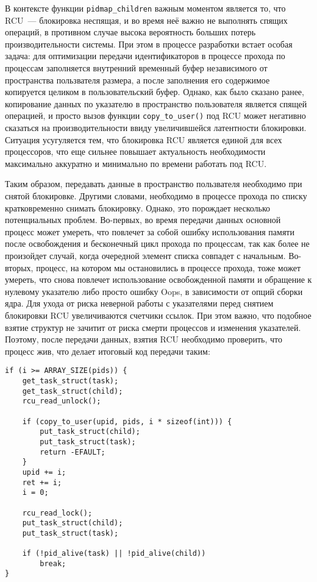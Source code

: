 В контексте функции \texttt{pidmap\_children} важным моментом является то, что
RCU~--- блокировка неспящая, и во время неё важно не выполнять спящих операций,
в противном случае высока вероятность больших потерь производительности системы.
При этом в процессе разработки встает особая задача: для оптимизации передачи
идентификаторов в процессе прохода по процессам заполняется внутренний временный
буфер независимого от пространства пользвателя размера, а после заполнения его
содержимое копируется целиком в пользовательский буфер. Однако, как было сказано
ранее, копирование данных по указателю в пространство пользователя является
спящей операцией, и просто вызов функции \texttt{copy\_to\_user()} под RCU может
негативно сказаться на производительности ввиду увеличившейся латентности
блокировки. Ситуация усугуляется тем, что блокировка RCU является единой для
всех процессоров, что еще сильнее повышает актуальность необходимости
максимально аккуратно и минимально по времени работать под RCU.

Таким образом, передавать данные в пространство пользвателя необходимо при
снятой блокировке. Другими словами, необходимо в процессе прохода по списку
кратковременно снимать блокировку. Однако, это порождает несколько потенциальных
проблем. Во-первых, во время передачи данных основной процесс может умереть, что
повлечет за собой ошибку использования памяти после освобождения и бесконечный
цикл прохода по процессам, так как более не произойдет случай, когда очередной
элемент списка совпадет с начальным. Во-вторых, процесс, на котором мы
остановились в процессе прохода, тоже может умереть, что снова повлечет
использование освобожденной памяти и обращение к нулевому указателю либо просто
ошибку Oops, в зависимости от опций сборки ядра. Для ухода от риска неверной
работы с указателями перед снятием блокировки RCU увеличиваются счетчики ссылок.
При этом важно, что подобное взятие структур не зачитит от риска смерти
процессов и изменения указателей. Поэтому, после передачи данных, взятия RCU
необходимо проверить, что процесс жив, что делает итоговый код передачи таким:
\medskip
\begin{lstlisting}[style=cstyle]
if (i >= ARRAY_SIZE(pids)) {
	get_task_struct(task);
	get_task_struct(child);
	rcu_read_unlock();

	if (copy_to_user(upid, pids, i * sizeof(int))) {
		put_task_struct(child);
		put_task_struct(task);
		return -EFAULT;
	}
	upid += i;
	ret += i;
	i = 0;

	rcu_read_lock();
	put_task_struct(child);
	put_task_struct(task);

	if (!pid_alive(task) || !pid_alive(child))
		break;
}
\end{lstlisting}
\medskip

